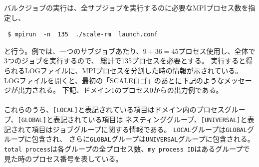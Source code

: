 バルクジョブの実行は、全サブジョブを実行するのに必要なMPIプロセス数を指定し、
\begin{verbatim}
 $ mpirun  -n  135  ./scale-rm  launch.conf
\end{verbatim}
と行う。例では、一つのサブジョブあたり、$9 + 36 = 45$プロセス使用し、全体で3つのジョブを実行するので、
総計で135プロセスを必要とする。
%
実行すると得られるLOGファイルに、MPIプロセスを分割した時の情報が示されている。
LOGファイルを開くと、最初の「SCALEロゴ」のあとに下記のようなメッセージが出力される。
下記、ドメイン1のプロセス0からの出力例である。\\

\\



これらのうち、\verb|[LOCAL]|と表記されている項目はドメイン内のプロセスグループ、\verb|[GLOBAL]|と表記されている項目は
ネスティンググループ、\verb|[UNIVERSAL]|と表記されて項目はジョブグループに関する情報である。
\verb|LOCAL|グループは\verb|GLOBAL|グループに包含され、
さらに\verb|GLOBAL|グループは\verb|UNIVERSAL|グループに包含される。
\verb|total process|は各グループの全プロセス数、\verb|my process ID|はあるグループで見た時のプロセス番号を表している。


